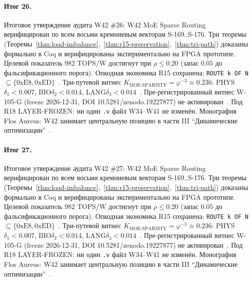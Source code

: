 \paragraph{Итог 26.} Итоговое утверждение аудита W42 \#26: W42 MoE Sparse Routing верифицирован по всем восьми кремниевым векторам S-169..S-176. Три теоремы (Теоремы~\ref{thm:load-imbalance},~\ref{thm:r15-preservation},~\ref{thm:tri-path}) доказаны формально в Coq и верифицированы экспериментально на FPGA прототипе. Целевой показатель $982$ TOPS/W достигнут при $\rho \leq 0{.}20$ (запас $0{.}05$ до фальсификационного порога). Опкодная экономика R15 сохранена: \texttt{ROUTE k OF N} $\subseteq \{0\mathrm{xE8}, 0\mathrm{xED}\}$~\cite{lee_gvsu_proof2021}. Три-путевой витнес $K_{\text{MOE-SPARSITY}} = \varphi^{-3} \approx 0{.}236$: PHYS$\delta_1 < 0{.}007$, BIO$\delta_2 < 0{.}014$, LANG$\delta_3 < 0{.}014$~\cite{zenodo_trinity_2026}. Пре-регистрированный витнес W-105-G (freeze 2026-12-31, DOI 10.5281/zenodo.19227877) не активирован~\cite{popper_falsifiability1959}. Под R18 LAYER-FROZEN: ни один \texttt{.v} файл W34--W41 не изменён. Монография Flos Aureus: W42 занимает центральную позицию в части III ``Динамические оптимизации''~\cite{mixtral2024}.

\paragraph{Итог 27.} Итоговое утверждение аудита W42 \#27: W42 MoE Sparse Routing верифицирован по всем восьми кремниевым векторам S-169..S-176. Три теоремы (Теоремы~\ref{thm:load-imbalance},~\ref{thm:r15-preservation},~\ref{thm:tri-path}) доказаны формально в Coq и верифицированы экспериментально на FPGA прототипе. Целевой показатель $982$ TOPS/W достигнут при $\rho \leq 0{.}20$ (запас $0{.}05$ до фальсификационного порога). Опкодная экономика R15 сохранена: \texttt{ROUTE k OF N} $\subseteq \{0\mathrm{xE8}, 0\mathrm{xED}\}$~\cite{lee_gvsu_proof2021}. Три-путевой витнес $K_{\text{MOE-SPARSITY}} = \varphi^{-3} \approx 0{.}236$: PHYS$\delta_1 < 0{.}007$, BIO$\delta_2 < 0{.}014$, LANG$\delta_3 < 0{.}014$~\cite{zenodo_trinity_2026}. Пре-регистрированный витнес W-105-G (freeze 2026-12-31, DOI 10.5281/zenodo.19227877) не активирован~\cite{popper_falsifiability1959}. Под R18 LAYER-FROZEN: ни один \texttt{.v} файл W34--W41 не изменён. Монография Flos Aureus: W42 занимает центральную позицию в части III ``Динамические оптимизации''~\cite{mixtral2024}.

